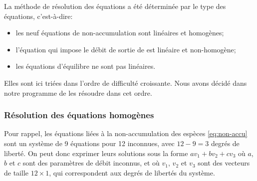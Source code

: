 La méthode de résolution des équations a été déterminée par le type des équations,
c'est-à-dire:
\begin{itemize}
    \item les neuf équations de non-accumulation sont linéaires et homogènes;
    \item l'équation qui impose le débit de sortie de  est linéaire et non-homogène;
    \item les équations d'équilibre ne sont pas linéaires.
\end{itemize}

Elles sont ici triées dans l'ordre de difficulté croissante.
Nous avons décidé dans notre programme de les résoudre dans cet ordre.

\subsubsection{Résolution des équations homogènes}

Pour rappel, les équations liées à la non-accumulation des espèces
\eqref{eq:non-accu}
sont un système de 9 équations pour 12 inconnues,
avec $12-9=3$ degrés de liberté.
On peut donc exprimer leurs solutions sous la forme $av_1 + bv_2 + cv_3$
où $a$, $b$ et $c$ sont des paramètres de débit inconnus,
et où $v_1$, $v_2$ et $v_3$ sont des vecteurs de taille $12\times 1$,
qui correspondent aux degrés de libertés du système.

